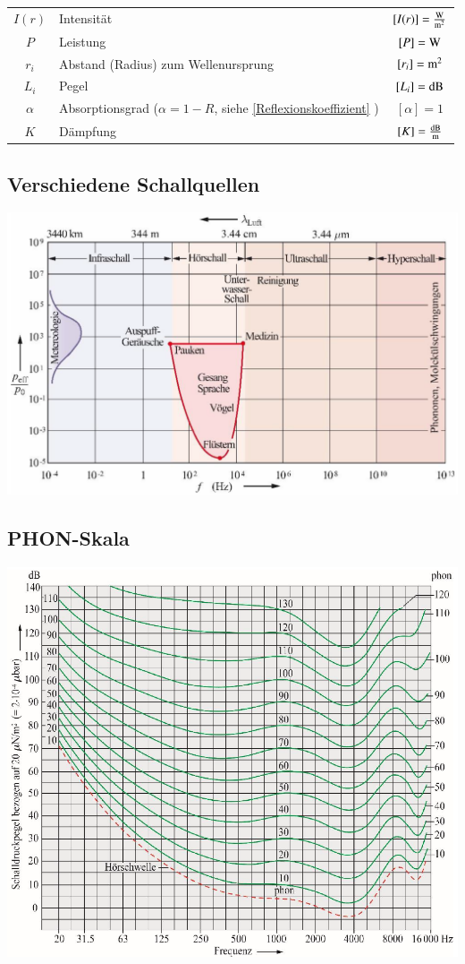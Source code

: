 \begin{tabular}{clc}
	$I(r)$ & Intensität & $[I(r)] = \frac{\mathrm{W}}{\mathrm{m}^2}$ \\
	$P$ & Leistung & $[P] = \mathrm{W}$ \\
	$r_i$ & Abstand (Radius) zum Wellenursprung & $[r_i] = \mathrm{m}^2$\\
	$L_i$ & Pegel & $[L_i] = \mathrm{dB}$ \\
	$\alpha$ & Absorptionsgrad ($\alpha = 1-R$, siehe \ref{Reflexionskoeffizient} ) & $[\alpha] = 1$ \\
	$K$ & Dämpfung & $[K] = \frac{\mathrm{dB}}{\mathrm{m}}$
\end{tabular}


\subsection{Verschiedene Schallquellen}

\includegraphics[width=0.9\linewidth]{Bilder/Wellen-Optik/schallquellen} \\

\subsection{PHON-Skala}
\includegraphics[width=0.95\linewidth]{Bilder/Wellen-Optik/phon_skala}



